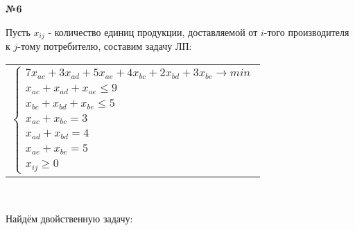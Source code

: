 \documentclass{article}
\newenvironment{task}{\begin{center}\fontsize{14}{14}\selectfont\bf}{\rm\fontsize{12}{12}\selectfont\end{center}}
\begin{document}


	\begin{task} 
		№6
	\end{task}
	Пусть $x_{ij}$ - количество единиц продукции, доставляемой от $i$-того производителя к $j$-тому потребителю, составим задачу ЛП:
	\begin{center}
		\begin{tabular}{c}
			$\begin{cases}
			7x_{ac} + 3x_{ad} + 5x_{ae} + 4x_{bc} + 2x_{bd} + 3x_{be} \rightarrow min \\
			x_{ac} + x_{ad} + x_{ae} \leq 9 \\
			x_{bc} + x_{bd} + x_{be} \leq 5 \\
			x_{ac} + x_{bc} = 3 \\
			x_{ad} + x_{bd} = 4 \\
			x_{ae} + x_{be} = 5 \\
			x_{ij} \geq 0
			\end{cases}$
		\end{tabular}\\
	\end{center}
	Найдём двойственную задачу:
\end{document}
